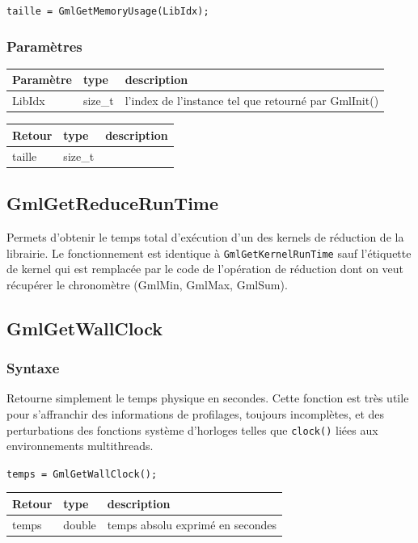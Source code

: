 \documentclass[a4paper,12pt]{article}
\begin{document}
{\tt taille = GmlGetMemoryUsage(LibIdx);}

\subsubsection*{Paramètres}

\begin{tabular}{|m{2cm}|m{1.5cm}|m{10.5cm}|}
\hline
Paramètre  & type    & description \\
\hline
LibIdx     & size\_t & l'index de l'instance tel que retourné par GmlInit() \\
\hline
\end{tabular}

\medskip

\begin{tabular}{|m{2cm}|m{1.5cm}|m{10.5cm}|}
\hline
Retour     & type    & description \\
\hline
taille     & size\_t & \\
\hline
\end{tabular}


\subsection{GmlGetReduceRunTime}

Permets d'obtenir le temps total d'exécution d'un des kernels de réduction de la librairie.
Le fonctionnement est identique à {\tt GmlGetKernelRunTime} sauf l'étiquette de kernel qui est remplacée par le code de l'opération de réduction dont on veut récupérer le chronomètre (GmlMin, GmlMax, GmlSum).


\subsection{GmlGetWallClock}

\subsubsection*{Syntaxe}

Retourne simplement le temps physique en secondes.
Cette fonction est très utile pour s'affranchir des informations de profilages, toujours incomplètes, et des perturbations des fonctions système d'horloges telles que {\tt clock()} liées aux environnements multithreads.

{\tt temps = GmlGetWallClock();}

\begin{tabular}{|m{2cm}|m{1.5cm}|m{10.5cm}|}
\hline
Retour     & type    & description \\
\hline
temps      & double & temps absolu exprimé en secondes\\
\hline
\end{tabular}
\end{document}
